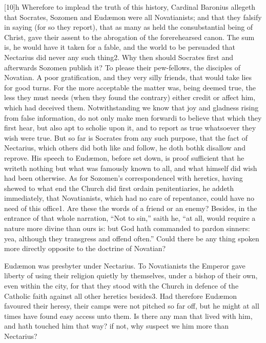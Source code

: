 [10]h Wherefore to implead the truth of this history, Cardinal Baronius allegeth that Socrates, Sozomen and Eudæmon were all Novatianists; and that they falsify in saying (for so they report), that as many as held the consubstantial being of Christ, gave their assent to the abrogation of the forerehearsed canon. The sum is, he would have it taken for a fable, and the world to be persuaded that Nectarius did never any such thing2. Why then should Socrates first and afterwards Sozomen publish it? To please their pew-fellows, the disciples of Novatian. A poor gratification, and they very silly friends, that would take lies for good turns. For the more acceptable the matter was, being deemed true, the less they must needs (when they found the contrary) either credit or affect him, which had deceived them. Notwithstanding we know that joy and gladness rising from false information, do not only make men forwardi to believe that which they  first hear, but also apt to scholie upon it, and to report as true whatsoever they wish were true. But so far is Socrates from any such purpose, that the fact of Nectarius, which others did both like and follow, he doth bothk disallow and reprove. His speech to Eudæmon, before set down, is proof sufficient that he writeth nothing but what was famously known to all, and what himself did wish had been otherwise. As for Sozomen’s correspondencel with heretics, having shewed to what end the Church did first ordain penitentiaries, he addeth immediately, that Novatianists, which had no care of repentance, could have no need of this office1. Are these the words of a friend or an enemy? Besides, in the entrance of that whole narration, “Not to sin,” saith he, “at all, would require a nature more divine than ours is: but God hath commanded to pardon sinners: yea, although they transgress and offend often.” Could there be any thing spoken more directly opposite to the doctrine of Novatian?

Eudæmon was presbyter under Nectarius. To Novatianists the Emperor gave liberty of using their religion quietly by themselves, under a bishop of their own, even within the city, for that they stood with the Church in defence of the Catholic faith against all other heretics besides3. Had therefore Eudæmon favoured their heresy, their camps were not pitched so far off, but he might at all times have found easy access unto them. Is there any man that lived with him, and hath touched him that way? if not, why suspect we him more than Nectarius?

